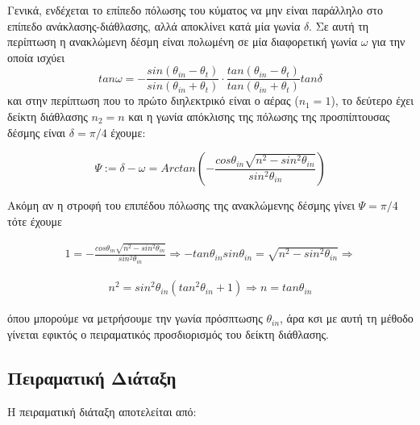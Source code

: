 \documentclass[a4paper]{article}
\begin{document}
Γενικά, ενδέχεται το επίπεδο πόλωσης του κύματος να μην είναι παράλληλο στο επίπεδο ανάκλασης-διάθλασης, αλλά αποκλίνει κατά μία γωνία $\delta$. Σε αυτή τη περίπτωση η ανακλώμενη δέσμη είναι πολωμένη σε μία διαφορετική γωνία $\omega$ για την οποία ισχύει 
$$ tan\omega = - \frac{sin(\theta_{in}-\theta_{t})}{sin(\theta_{in}+\theta_{t})} \cdot \frac{tan(\theta_{in}-\theta_{t})}{tan(\theta_{in}+\theta_t)} tan\delta $$
και στην περίπτωση που το πρώτο διηλεκτρικό είναι ο αέρας ($n_1=1$), το δεύτερο έχει δείκτη διάθλασης $n_2 = n$ και η γωνία απόκλισης της πόλωσης της προσπίπτουσας δέσμης είναι $\delta=\pi/4$ έχουμε: 
 
\begin{equation}\label{6}
\Psi := \delta - \omega = Arctan\left( - \frac{cos\theta_{in}\sqrt{n^2-sin^2\theta_{in}}}{sin^2\theta_{in}} \right)  
\end{equation}

 Ακόμη αν η στροφή του επιπέδου πόλωσης της ανακλώμενης δέσμης γίνει $\Psi=\pi /4$ τότε έχουμε 
 

  \begin{align*}
 	1 =-  \frac{cos\theta_{in}\sqrt{n^2-sin^2\theta_{in}}}{sin^2\theta_{in}} \Rightarrow -tan\theta_{in}sin\theta_{in} = \sqrt{n^2-sin^2\theta_{in}} \Rightarrow  \end{align*} 
 	
 	\begin{align}\label{7} 
 	 n^2 = sin^2\theta_{in} \left( tan^2\theta_{in} + 1  \right) \Rightarrow \boxed{n = tan\theta_{in} }
 	\end{align}


 όπου μπορούμε να μετρήσουμε την γωνία πρόσπτωσης $\theta_{in}$, άρα κσι με αυτή τη μέθοδο γίνεται εφικτός ο πειραματικός προσδιορισμός του δείκτη διάθλασης.
 
 
 
\subsection*{Πειραματική Διάταξη}

Η πειραματική διάταξη αποτελείται από: 
\end{document}
